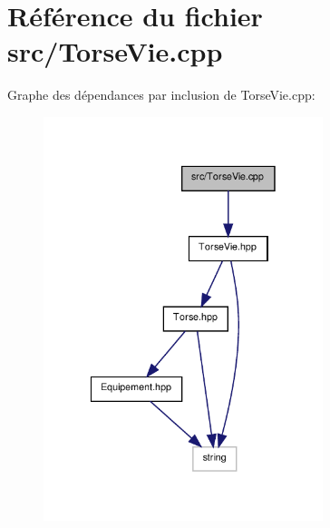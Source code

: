 \section{Référence du fichier src/\-Torse\-Vie.cpp}
\label{_torse_vie_8cpp}
Graphe des dépendances par inclusion de Torse\-Vie.\-cpp\-:\nopagebreak
\begin{figure}[H]
\begin{center}
\leavevmode
\includegraphics[width=231pt]{_torse_vie_8cpp__incl}
\end{center}
\end{figure}
